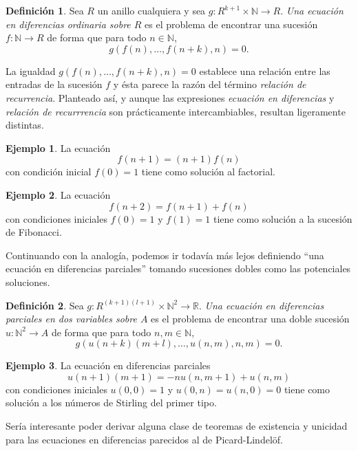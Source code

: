 \documentclass[letter,10pt,notitlepage]{amsart}
\theoremstyle{definition}
\newtheorem{definition}{Definición}
\newtheorem*{example}{Ejemplo}
\theoremstyle{remark}
\begin{document}
\begin{definition}
  Sea \( R\) un anillo cualquiera y sea \( g \colon R^{k+1} \times \mathbb{N} \to R\).
  \emph{Una ecuación en diferencias ordinaria sobre \( R\)} es el 
  problema de encontrar una sucesión \( f \colon \mathbb{N} \to R\) 
  de forma que para todo \( n \in \mathbb{N}\),
  \[ g(f(n), \dots, f(n+k),n) = 0.\]
\end{definition}

La igualdad \( g(f(n), \dots, f(n+k),n) = 0\)
establece una relación entre las entradas de la sucesión \( f\) y ésta
parece la razón del término \emph{relación de recurrencia}. Planteado
así, y aunque las expresiones \emph{ecuación en diferencias} y 
\emph{relación de recurrrencia} son prácticamente intercambiables, resultan
ligeramente distintas.

\begin{example}
  La ecuación \[ f(n+1) = (n+1)f(n)\] con condición inicial \( f(0)=1\)
  tiene como solución al factorial.
\end{example}

\begin{example}
  La ecuación \[ f(n+2) = f(n+1) + f(n)\] con condiciones iniciales
  \( f(0) = 1\) y \( f(1) = 1\) tiene como solución a la sucesión de Fibonacci.
\end{example}

Continuando con la analogía, podemos ir todavía más lejos definiendo 
``una ecuación en diferencias parciales'' tomando sucesiones dobles como
las potenciales soluciones.

\begin{definition}
  Sea \( g \colon R^{(k+1)(l+1)} \times \mathbb{N}^2 \to \mathbb{R}\).
  \emph{Una ecuación en diferencias parciales en dos variables sobre \( A\)} es el 
  problema de encontrar una doble sucesión \( u \colon \mathbb{N}^2 \to A\) 
  de forma que para todo \( n,m \in \mathbb{N}\),
  \[ g\left(u(n+k)(m+l),\dots,u(n,m),n,m\right) = 0.\]
\end{definition}


\begin{example}
  La ecuación en diferencias parciales \[ u(n+1)(m+1) = -nu(n,m+1) + u(n,m)\]
  con condiciones iniciales \( u(0,0) = 1\) y \( u(0,n) = u(n,0) = 0\)
  tiene como solución a los números de Stirling del primer tipo.
\end{example}

Sería interesante poder derivar alguna clase de teoremas de existencia
y unicidad para las ecuaciones en diferencias parecidos al de
Picard-Lindelöf.
\end{document}

